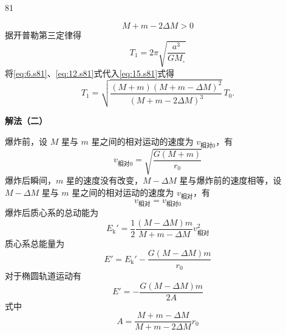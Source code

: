 \begin{solution}{81}
\begin{subsolution}
\begin{subsubsolution}
\begin{equation}
                M + m - 2\Delta M > 0
                \label{eq:14.s81}
            \end{equation}
            据开普勒第三定律得
            \begin{equation}
                T_{1} = 2\pi \sqrt{\frac{a^{3}}{G M_{\square}}}
                \label{eq:15.s81}
            \end{equation}
            将\eqref{eq:6.s81}、\eqref{eq:12.s81}式代入\eqref{eq:15.s81}式得
            \begin{equation}
                T_{1} = \sqrt{\frac{(M+m)(M+m-\Delta M)^{2}}{(M+m-2\Delta M)^{3}}} \, T_{0}.
                \label{eq:16.s81}
            \end{equation}

            \textbf{解法（二）}

            爆炸前，设 $M$ 星与 $m$ 星之间的相对运动的速度为 $v_{\text{相对}0}$，有
            \begin{equation}
                v_{\text{相对}0} = \sqrt{\frac{G(M+m)}{r_{0}}}
                \label{eq:17.s81}
            \end{equation}
            爆炸后瞬间，$m$ 星的速度没有改变，$M-\Delta M$ 星与爆炸前的速度相等，设 $M-\Delta M$ 星与 $m$ 星之间的相对运动的速度为 $v_{\text{相对}}$，有
            \begin{equation}
                v_{\text{相对}} = v_{\text{相对}0}
                \label{eq:18.s81}
            \end{equation}
            爆炸后质心系的总动能为
            \begin{equation}
                E_{\mathrm{k}}' = \frac{1}{2} \frac{(M-\Delta M) m}{M+m-\Delta M} v_{\text{相对}}^{2}
                \label{eq:19.s81}
            \end{equation}
            质心系总能量为
            \begin{equation}
                E' = E_{\mathrm{k}}' - \frac{G(M-\Delta M) m}{r_{0}}
                \label{eq:20.s81}
            \end{equation}
            对于椭圆轨道运动有
            \begin{equation}
                E' = - \frac{G(M-\Delta M) m}{2A}
                \label{eq:21.s81}
            \end{equation}
            式中
            \begin{equation}
                A = \frac{M+m-\Delta M}{M+m-2\Delta M} r_{0}
                \label{eq:22.s81}
            \end{equation}

\end{subsubsolution}
\end{subsolution}
\end{solution}
